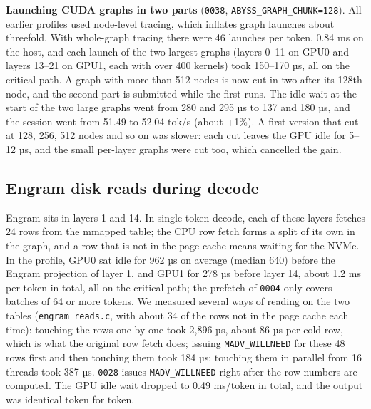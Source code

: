 \documentclass[11pt,a4paper]{article}
\newcommand{\code}[1]{\texttt{#1}}
\newcommand{\tps}{tok/s}
\begin{document}
\textbf{Launching CUDA graphs in two parts} (\code{0038}, \code{ABYSS\_GRAPH\_CHUNK=128}). All earlier profiles used node-level tracing, which inflates graph launches about threefold. With whole-graph tracing there were 46 launches per token, 0.84 ms on the host, and each launch of the two largest graphs (layers 0--11 on GPU0 and layers 13--21 on GPU1, each with over 400 kernels) took 150--170 µs, all on the critical path. A graph with more than 512 nodes is now cut in two after its 128th node, and the second part is submitted while the first runs. The idle wait at the start of the two large graphs went from 280 and 295 µs to 137 and 180 µs, and the session went from 51.49 to 52.04 \tps{} (about +1\%). A first version that cut at 128, 256, 512 nodes and so on was slower: each cut leaves the GPU idle for 5--12 µs, and the small per-layer graphs were cut too, which cancelled the gain.

\subsection{Engram disk reads during decode}
\label{sec:engramdecode}

Engram sits in layers 1 and 14. In single-token decode, each of these layers fetches 24 rows from the mmapped table; the CPU row fetch forms a split of its own in the graph, and a row that is not in the page cache means waiting for the NVMe. In the profile, GPU0 sat idle for 962 µs on average (median 640) before the Engram projection of layer 1, and GPU1 for 278 µs before layer 14, about 1.2 ms per token in total, all on the critical path; the prefetch of \code{0004} only covers batches of 64 or more tokens. We measured several ways of reading on the two tables (\code{engram\_reads.c}, with about 34 of the rows not in the page cache each time): touching the rows one by one took 2,896 µs, about 86 µs per cold row, which is what the original row fetch does; issuing \code{MADV\_WILLNEED} for these 48 rows first and then touching them took 184 µs; touching them in parallel from 16 threads took 387 µs. \code{0028} issues \code{MADV\_WILLNEED} right after the row numbers are computed. The GPU idle wait dropped to 0.49 ms/token in total, and the output was identical token for token.
\end{document}
